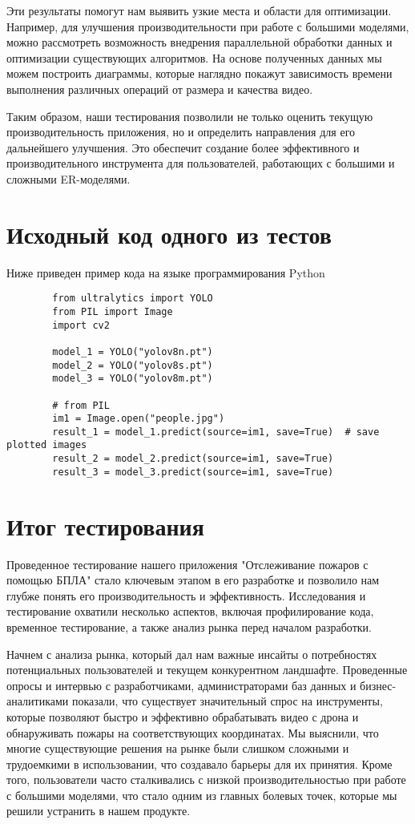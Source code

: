     Эти результаты помогут нам выявить узкие места и области для оптимизации. Например, для улучшения производительности при работе с большими моделями, можно рассмотреть возможность внедрения параллельной обработки данных и оптимизации существующих алгоритмов. На основе полученных данных мы можем построить диаграммы, которые наглядно покажут зависимость времени выполнения различных операций от размера и качества видео.

    Таким образом, наши тестирования позволили не только оценить текущую производительность приложения, но и определить направления для его дальнейшего улучшения. Это обеспечит создание более эффективного и производительного инструмента для пользователей, работающих с большими и сложными ER-моделями.

    \section{Исходный код одного из тестов}
    Ниже приведен пример кода на языке программирования Python

    \begin{lstlisting}
        from ultralytics import YOLO
        from PIL import Image
        import cv2
        
        model_1 = YOLO("yolov8n.pt")
        model_2 = YOLO("yolov8s.pt")
        model_3 = YOLO("yolov8m.pt")
        
        # from PIL
        im1 = Image.open("people.jpg")
        result_1 = model_1.predict(source=im1, save=True)  # save plotted images
        result_2 = model_2.predict(source=im1, save=True)
        result_3 = model_3.predict(source=im1, save=True)
    \end{lstlisting}

    \section{Итог тестирования}
    Проведенное тестирование нашего приложения "Отслеживание пожаров с помощью БПЛА" стало ключевым этапом в его разработке и позволило нам глубже понять его производительность и эффективность. Исследования и тестирование охватили несколько аспектов, включая профилирование кода, временное тестирование, а также анализ рынка перед началом разработки.

    Начнем с анализа рынка, который дал нам важные инсайты о потребностях потенциальных пользователей и текущем конкурентном ландшафте. Проведенные опросы и интервью с разработчиками, администраторами баз данных и бизнес-аналитиками показали, что существует значительный спрос на инструменты, которые позволяют быстро и эффективно обрабатывать видео с дрона и обнаруживать пожары на соответствующих координатах. Мы выяснили, что многие существующие решения на рынке были слишком сложными и трудоемкими в использовании, что создавало барьеры для их принятия. Кроме того, пользователи часто сталкивались с низкой производительностью при работе с большими моделями, что стало одним из главных болевых точек, которые мы решили устранить в нашем продукте.

